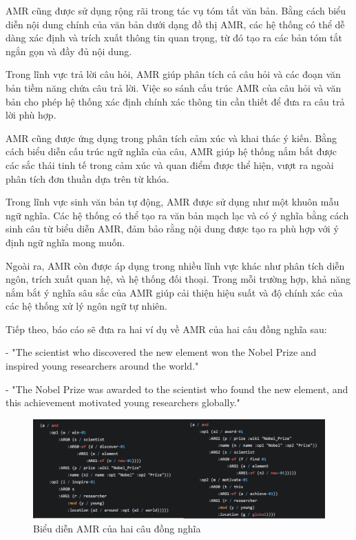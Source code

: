 AMR cũng được sử dụng rộng rãi trong tác vụ tóm tắt văn bản. Bằng cách biểu diễn nội dung chính của văn bản dưới dạng đồ thị AMR, các hệ thống có thể dễ dàng xác định và trích xuất thông tin quan trọng, từ đó tạo ra các bản tóm tắt ngắn gọn và đầy đủ nội dung.

Trong lĩnh vực trả lời câu hỏi, AMR giúp phân tích cả câu hỏi và các đoạn văn bản tiềm năng chứa câu trả lời. Việc so sánh cấu trúc AMR của câu hỏi và văn bản cho phép hệ thống xác định chính xác thông tin cần thiết để đưa ra câu trả lời phù hợp.

AMR cũng được ứng dụng trong phân tích cảm xúc và khai thác ý kiến. Bằng cách biểu diễn cấu trúc ngữ nghĩa của câu, AMR giúp hệ thống nắm bắt được các sắc thái tinh tế trong cảm xúc và quan điểm được thể hiện, vượt ra ngoài phân tích đơn thuần dựa trên từ khóa.

Trong lĩnh vực sinh văn bản tự động, AMR được sử dụng như một khuôn mẫu ngữ nghĩa. Các hệ thống có thể tạo ra văn bản mạch lạc và có ý nghĩa bằng cách sinh câu từ biểu diễn AMR, đảm bảo rằng nội dung được tạo ra phù hợp với ý định ngữ nghĩa mong muốn.

Ngoài ra, AMR còn được áp dụng trong nhiều lĩnh vực khác như phân tích diễn ngôn, trích xuất quan hệ, và hệ thống đối thoại. Trong mỗi trường hợp, khả năng nắm bắt ý nghĩa sâu sắc của AMR giúp cải thiện hiệu suất và độ chính xác của các hệ thống xử lý ngôn ngữ tự nhiên.

Tiếp theo, báo cáo sẽ đưa ra hai ví dụ về AMR của hai câu đồng nghĩa sau:

- "The scientist who discovered the new element won the Nobel Prize and inspired young researchers around the world."

- "The Nobel Prize was awarded to the scientist who found the new element, and this achievement motivated young researchers globally."

\begin{figure}[H]
    \centering
    \includegraphics[width=1\linewidth]{Images/GDL/amr_2_sym.png}
    \caption{Biểu diễn AMR của hai câu đồng nghĩa}
    \label{fig:amr_sym}
\end{figure}

